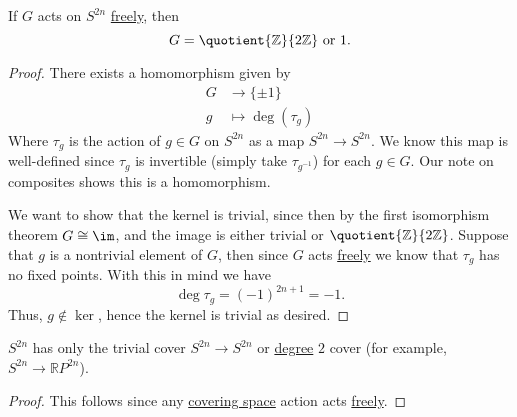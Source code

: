 \begin{theorem}\label{thm:actions-on-spheres}
	If \(G\) acts on \(S^{2n}\) \hyperref[def:free-group]{freely}, then
	\[
		G = \quotient{\mathbb{Z}}{2\mathbb{Z}} \text{ or } 1.
	\]
\end{theorem}
\begin{proof}
	There exists a homomorphism given by
	\[
		\begin{split}
			G & \to \{\pm 1\}        \\
			g & \mapsto \deg(\tau_g)
		\end{split}
	\]
	Where \(\tau_g\) is the action of \(g \in G\) on \(S^{2n}\) as a map \(S^{2n} \to S^{2n}\). We know this map is well-defined since \(\tau_g\) is invertible
	(simply take \(\tau_{g^{-1}}\)) for each \(g \in G\). Our note on composites shows this is a homomorphism.

	We want to show that the kernel is trivial, since then by the first isomorphism theorem \(G \cong \im\), and the image is either trivial or
	\(\quotient{\mathbb{Z}}{2\mathbb{Z}}\). Suppose that \(g\) is a nontrivial element of \(G\), then since \(G\) acts \hyperref[def:free-group]{freely} we know that
	\(\tau_g\) has no fixed points. With this in mind we have
	\[
		\deg \tau_g = (-1)^{2n + 1} = - 1.
	\]
	Thus, \(g \not\in \ker\), hence the kernel is trivial as desired.
\end{proof}

\begin{corollary}
	\(S^{2n}\) has only the trivial cover \(S^{2n} \to S^{2n}\) or \hyperref[def:degree]{degree} \(2\) cover (for example, \(S^{2n} \to \mathbb{R}P^{2n}\)).
\end{corollary}
\begin{proof}
	This follows since any \hyperref[def:covering-space]{covering space} action acts \hyperref[def:free-group]{freely}.
\end{proof}

